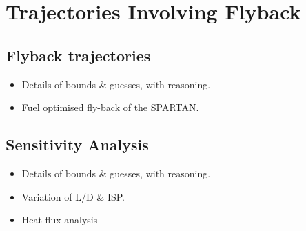 
\cleardoublepage
\chapter{Trajectories Involving Flyback}\label{chapter:numerical}


\section{Flyback trajectories }

\begin{itemize}
	\item Details of bounds \& guesses, with reasoning. 
	\item Fuel optimised fly-back of the SPARTAN. 
\end{itemize}

\section{Sensitivity Analysis}

\begin{itemize}
	\item Details of bounds \& guesses, with reasoning. 
	\item Variation of L/D \& ISP.
	\item Heat flux analysis
\end{itemize}